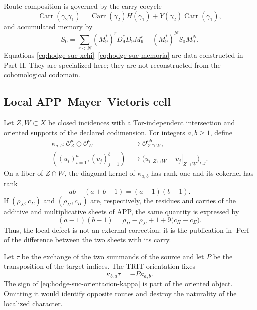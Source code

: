 Route composition is governed by the carry cocycle
\begin{equation}\label{eq:hodge-suc-carry}
 \operatorname{Carr}(\gamma _2\gamma _1)
 =\operatorname{Carr}(\gamma _2)H(\gamma _1)
  +Y(\gamma _2)\operatorname{Carr}(\gamma _1),
\end{equation}
and accumulated memory by
\begin{equation}\label{eq:hodge-suc-memoria}
 S_0=\sum_{r<N}(M_9^{*})^{r}D_9^{*}D_9M_9^{r}
     +(M_9^{*})^{N}S_0M_9^{N}.
\end{equation}
Equations \eqref{eq:hodge-suc-xchi}--\eqref{eq:hodge-suc-memoria}
are data constructed in Part II. They are specialized here; they are not
reconstructed from the cohomological codomain.

\subsection*{Local APP--Mayer--Vietoris cell}

Let \(Z,W\subset X\) be closed incidences with a
Tor-independent intersection and oriented supports of the declared codimension. For
integers \(a,b\geq1\), define
\begin{equation}\label{eq:hodge-suc-kappa}
 \begin{aligned}
 \kappa_{a,b}:\mathcal O_Z^{a}\oplus\mathcal O_W^{b}
 &\longrightarrow \mathcal O_{Z\cap W}^{ab},\\
 ((u_i)_{i=1}^{a},(v_j)_{j=1}^{b})
 &\longmapsto
 \bigl(u_i|_{Z\cap W}-v_j|_{Z\cap W}\bigr)_{i,j}.
 \end{aligned}
\end{equation}
On a fiber of \(Z\cap W\), the diagonal kernel of
\(\kappa_{a,b}\) has rank one and its cokernel has rank
\begin{equation}\label{eq:hodge-suc-defecto-rango}
 ab-(a+b-1)=(a-1)(b-1).
\end{equation}
If \((\rho_{\Sigma},c_{\Sigma})\) and
\((\rho_{\Pi},c_{\Pi})\) are, respectively, the residues and carries of
the additive and multiplicative sheets of APP, the same quantity is expressed by
\begin{equation}\label{eq:hodge-suc-celda-carry}
 (a-1)(b-1)
 =\rho_{\Pi}-\rho_{\Sigma}+1
  +9\bigl(c_{\Pi}-c_{\Sigma}\bigr).
\end{equation}
Thus, the local defect is not an external correction: it is the publication in
\(\operatorname{Perf}\) of the difference between the two sheets with its carry.

Let \(\tau\) be the exchange of the two summands of the source and let \(P\)
be the transposition of the target indices. The TRIT orientation fixes
\begin{equation}\label{eq:hodge-suc-orientacion-kappa}
 \kappa_{b,a}\tau=-P\kappa_{a,b}.
\end{equation}
The sign of \eqref{eq:hodge-suc-orientacion-kappa} is part of the oriented
object. Omitting it would identify opposite routes and destroy the
naturality of the localized character.

